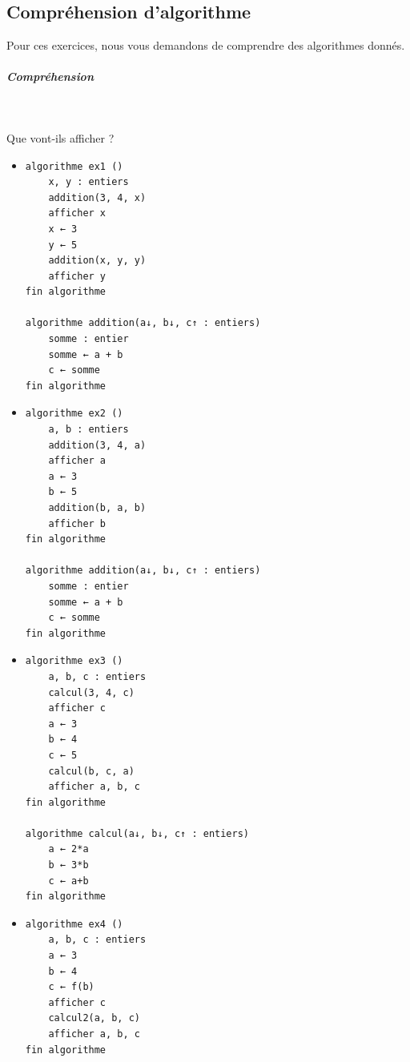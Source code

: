 \documentclass[11pt,a4paper]{article}
\begin{document}
            \par
        \subsection{Compr\'ehension d'algorithme}
          Pour ces exercices, nous vous demandons de comprendre des algorithmes donn\'es. 
          
			
		\subparagraph{Compr\'ehension} 
		
                \textcolor{white}{.} \par
            
							  Que vont-ils afficher ?
              
					\begin{itemize}
				
			\item \begin{verbatim}
algorithme ex1 ()
    x, y : entiers
    addition(3, 4, x)
    afficher x
    x ← 3
    y ← 5
    addition(x, y, y)
    afficher y
fin algorithme

algorithme addition(a↓, b↓, c↑ : entiers)
    somme : entier
    somme ← a + b
    c ← somme
fin algorithme
				\end{verbatim} \textcolor{gray}{\underline{\hspace*{1em}}}  \textcolor{gray}{\underline{\hspace*{1em}}} 
			\item \begin{verbatim}
algorithme ex2 ()
    a, b : entiers
    addition(3, 4, a)
    afficher a
    a ← 3
    b ← 5
    addition(b, a, b)
    afficher b
fin algorithme

algorithme addition(a↓, b↓, c↑ : entiers)
    somme : entier
    somme ← a + b
    c ← somme
fin algorithme
				\end{verbatim} \textcolor{gray}{\underline{\hspace*{1em}}}  \textcolor{gray}{\underline{\hspace*{1em}}} 
			\item \begin{verbatim}
algorithme ex3 ()
    a, b, c : entiers
    calcul(3, 4, c)
    afficher c
    a ← 3
    b ← 4
    c ← 5
    calcul(b, c, a)
    afficher a, b, c
fin algorithme

algorithme calcul(a↓, b↓, c↑ : entiers)
    a ← 2*a
    b ← 3*b
    c ← a+b
fin algorithme
				            \end{verbatim} \textcolor{gray}{\underline{\hspace*{2em}}}  \textcolor{gray}{\underline{\hspace*{2em}}} 
			\item \begin{verbatim}
algorithme ex4 ()
    a, b, c : entiers
    a ← 3
    b ← 4
    c ← f(b)
    afficher c
    calcul2(a, b, c)
    afficher a, b, c
fin algorithme


\end{verbatim}
\end{itemize}
\end{document}
